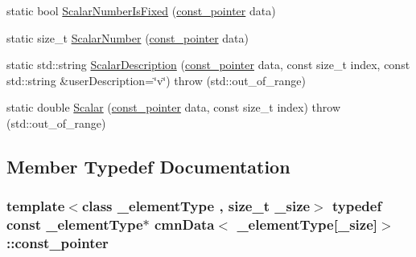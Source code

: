 \begin{DoxyCompactItemize}
\item 
static bool \hyperlink{classcmn_data_3_01__element_type[__size]_4_a35050d0470d40a48d9d6bdef410f803b}{Scalar\+Number\+Is\+Fixed} (\hyperlink{classcmn_data_3_01__element_type[__size]_4_aaf9e2a181a2500f07b6c99b2bf42477f}{const\+\_\+pointer} data)
\item 
static size\+\_\+t \hyperlink{classcmn_data_3_01__element_type[__size]_4_a1e40f88a9327ae4832424c5b807f2fff}{Scalar\+Number} (\hyperlink{classcmn_data_3_01__element_type[__size]_4_aaf9e2a181a2500f07b6c99b2bf42477f}{const\+\_\+pointer} data)
\item 
static std\+::string \hyperlink{classcmn_data_3_01__element_type[__size]_4_a476fe08e0efb517af46ec4e649708903}{Scalar\+Description} (\hyperlink{classcmn_data_3_01__element_type[__size]_4_aaf9e2a181a2500f07b6c99b2bf42477f}{const\+\_\+pointer} data, const size\+\_\+t index, const std\+::string \&user\+Description=\char`\"{}v\char`\"{})  throw (std\+::out\+\_\+of\+\_\+range)
\item 
static double \hyperlink{classcmn_data_3_01__element_type[__size]_4_a9585ed8aab16491a685ad139e7c220c5}{Scalar} (\hyperlink{classcmn_data_3_01__element_type[__size]_4_aaf9e2a181a2500f07b6c99b2bf42477f}{const\+\_\+pointer} data, const size\+\_\+t index)  throw (std\+::out\+\_\+of\+\_\+range)
\end{DoxyCompactItemize}


\subsection{Member Typedef Documentation}
\hypertarget{classcmn_data_3_01__element_type[__size]_4_aaf9e2a181a2500f07b6c99b2bf42477f}{}
\subsubsection[{const\+\_\+pointer}]{\setlength{\rightskip}{0pt plus 5cm}template$<$class \+\_\+element\+Type , size\+\_\+t \+\_\+size$>$ typedef const \+\_\+element\+Type$\ast$ {\bf cmn\+Data}$<$ \+\_\+element\+Type\mbox{[}\+\_\+size\mbox{]}$>$\+::{\bf const\+\_\+pointer}}\label{classcmn_data_3_01__element_type[__size]_4_aaf9e2a181a2500f07b6c99b2bf42477f}
\hypertarget{classcmn_data_3_01__element_type[__size]_4_ad12f77b67872d7ed06978b393bc3d29e}{}
